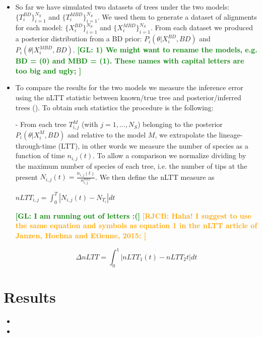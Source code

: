 \documentclass{article}
\newcommand*\richel[1]{\textcolor{orange}{\textbf{[RJCB: #1]}}}
\newcommand*\gio[1]{\textcolor{green}{\textbf{[GL: #1]}}}
\begin{document}
\begin{itemize}
\item So far we have simulated two datasets of trees under the two models: 
$\{T_{i}^{BD}\}_{i=1}^{N_{S}}$ and $\{T_{i}^{MBD}\}_{i=1}^{N_{S}}$.
We used them to generate a dataset of alignments for each model: $\{X^{BD}_{i}\}_{i=1}^{N_{S}}$ and $\{X^{MBD}_{i}\}_{i=1}^{N_{S}}$. From each dataset we produced a posterior distribution from a BD prior: 
$P_{i}(\theta | X^{BD}_{i}, BD)$ and $P_{i}(\theta | X^{MBD}_{i}, BD)$.
\gio{
  1) We might want to rename the models, e.g. BD = (0) and MBD = (1). These names with capital letters are too big and ugly;
}

\item To compare the results for the two models we measure the inference 
error using the nLTT statistic between known/true tree and 
posterior/inferred trees (\cite{nltt}). 
To obtain such statistics the procedure is the following:

- From each tree $T_{i,j}^{M}$ (with $j=1,...,N_{S}$) 
  belonging to the posterior $P_{i}(\theta | X^{M}_{i}, BD)$ 
  and relative to the model $M$, we extrapolate the lineage-through-time (LTT), 
  in other words we measure the number of species as a function of 
  time $n_{i,j}(t)$. To allow a comparison we normalize dividing by the 
  maximum number of species of each tree, i.e. the number of tips at the 
  present $N_{i,j}(t)=\frac{n_{i,j}(t)}{n^{max}_{i,j}}$. We then define the 
  nLTT measure as

$nLTT_{i,j} = \int_{0}^{T} | N_{i,j}(t) - N_{T_{i}} | dt$

\gio{I am running out of letters :(}
\richel{Haha! I suggest to use the same equation and symbols 
  as equation 1 in
  the nLTT article of Janzen, Hoehna and Etienne, 2015:
}

$$
\Delta nLTT = \int_{0}^{1} | nLTT_1(t) - nLTT_2{t} | dt
$$

\end{itemize}

\section{Results}
\begin{itemize}

\item

\item

\end{itemize}




\appendix


\end{document}
